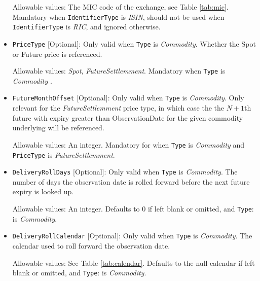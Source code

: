 \begin{itemize}
Allowable values:  The MIC code of the exchange, see Table \ref{tab:mic}. Mandatory when \lstinline!IdentifierType! is  \emph{ISIN}, should not be used when  \lstinline!IdentifierType! is \emph{RIC}, and ignored otherwise.

\item \lstinline!PriceType! [Optional]:
Only valid when  \lstinline!Type! is  \emph{Commodity}.  Whether the Spot or Future price is referenced. 

Allowable values:  \emph{Spot}, \emph{FutureSettlemment}. Mandatory when  \lstinline!Type! is  \emph{Commodity} .

\item \lstinline!FutureMonthOffset! [Optional]:
Only valid when  \lstinline!Type! is  \emph{Commodity}. Only relevant for the \emph{FutureSettlemment} price type, in which case the the $N+1$th future with
  expiry greater than ObservationDate for the given commodity underlying will be referenced.

Allowable values:  An integer. Mandatory for when  \lstinline!Type! is  \emph{Commodity} and \lstinline!PriceType! is \emph{FutureSettlemment}.

\item \lstinline!DeliveryRollDays! [Optional]:
Only valid when  \lstinline!Type! is  \emph{Commodity}.  The number of days the observation date is rolled forward before the
  next future expiry is looked up.
  
Allowable values: An integer. Defaults to 0 if left blank or omitted, and \lstinline!Type!: is  \emph{Commodity}.

\item \lstinline!DeliveryRollCalendar! [Optional]:
Only valid when  \lstinline!Type! is  \emph{Commodity}.  The calendar used to roll forward the observation date.

Allowable values: See Table \ref{tab:calendar}. Defaults to the null calendar if left blank or omitted, and \lstinline!Type!: is  \emph{Commodity}.

\end{itemize}
